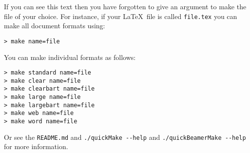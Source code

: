 \documentclass{article}
\begin{document}
If you can see this text then you have forgotten to give an argument to make the file of your choice. For instance, if your \LaTeX~file is called \verb=file.tex= you can make all document formats using:
\begin{verbatim}
> make name=file
\end{verbatim}
You can make individual formats as follows:
\begin{verbatim}
> make standard name=file
> make clear name=file
> make clearbart name=file
> make large name=file
> make largebart name=file
> make web name=file
> make word name=file
\end{verbatim}
Or see the \verb=README.md= and \verb=./quickMake --help= and \verb=./quickBeamerMake --help= for more information.
\end{document}
